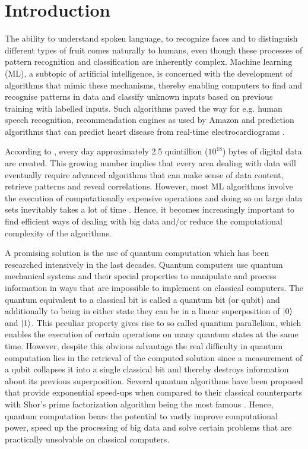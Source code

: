 \documentclass[a4paper]{article}
\newcommand*{\0}{$\ket{0}$}
\newcommand*{\1}{$\ket{1}$}
\begin{document}
\section{Introduction}
\label{sec:introduction}


The ability to understand spoken language, to recognize faces and to distinguish different types of fruit comes naturally to humans, even though these processes of pattern recognition and classification are inherently complex. Machine learning (ML), a subtopic of artificial intelligence, is concerned with the development of algorithms that mimic these mechanisms, thereby enabling computers to find and recognise patterns in data and classify unknown inputs based on previous training with labelled inputs. Such algorithms paved the way for e.g. human speech recognition, recommendation engines as used by Amazon and prediction algorithms that can predict heart disease from real-time electrocardiograms \citep{acharya2015integrated}.

According to \cite*{bigdata}, every day approximately 2.5 quintillion (${10}^{18}$) bytes of digital data are created. This growing number implies that every area dealing with data will eventually require advanced algorithms that can make sense of data content, retrieve patterns and reveal correlations. However, most ML algorithms involve the execution of computationally expensive operations and doing so on large data sets inevitably takes a lot of time \citep{bekkerman2011scaling}. Hence, it becomes increasingly important to find efficient ways of dealing with big data and/or reduce the computational complexity of the algorithms.

A promising solution is the use of quantum computation which has been researched intensively in the last decades. Quantum computers use quantum mechanical systems and their special properties to manipulate and process information in ways that are impossible to implement on classical computers. The quantum equivalent to a classical bit is called a quantum bit (or qubit) and additionally to being in either state they can be in a linear superposition of \0 and \1. This peculiar property gives rise to so called quantum parallelism, which enables the execution of certain operations on many quantum states at the same time. However, despite this obvious advantage the real difficulty in quantum computation lies in the retrieval of the computed solution since a measurement of a qubit collapses it into a single classical bit and thereby destroys information about its previous superposition. Several quantum algorithms have been proposed that provide exponential speed-ups when compared to their classical counterparts with Shor's prime factorization algorithm being the most famous \citep{shor1994}. Hence, quantum computation bears the potential to vastly improve computational power, speed up the processing of big data and solve certain problems that are practically unsolvable on classical computers. 
\end{document}
